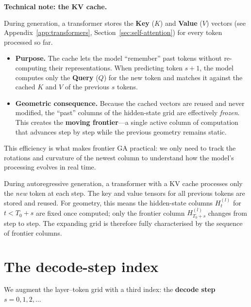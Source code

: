 \documentclass[11pt, twoside, openright]{memoir}
\numberwithin{equation}{chapter}
\begin{document}
\begin{mathbox}
\textbf{Technical note: the KV cache.}

During generation, a transformer stores the \textbf{Key} ($K$) and
\textbf{Value} ($V$) vectors (see Appendix~\ref{app:transformers},
Section~\ref{sec:self-attention}) for every token processed so far.

\begin{itemize}[nosep]
\item \textbf{Purpose.}  The cache lets the model ``remember'' past
  tokens without re-computing their representations.  When predicting
  token $s{+}1$, the model computes only the \textbf{Query} ($Q$) for
  the new token and matches it against the cached $K$ and $V$ of the
  previous $s$ tokens.
\item \textbf{Geometric consequence.}  Because the cached vectors are
  reused and never modified, the ``past'' columns of the hidden-state
  grid are effectively \emph{frozen}.  This creates the
  \textbf{moving frontier}---a single active column of computation
  that advances step by step while the previous geometry remains
  static.
\end{itemize}

This efficiency is what makes frontier GA practical: we only need to
track the rotations and curvature of the newest column to understand
how the model's processing evolves in real time.
\end{mathbox}

\begin{transformer}
During autoregressive generation, a transformer with a KV cache
processes only the \emph{new} token at each step.  The key and value
tensors for all previous tokens are stored and reused.
For geometry, this means the hidden-state columns $H^{(l)}_{t}$ for
$t < T_0 + s$ are fixed once computed; only the frontier column
$H^{(l)}_{T_0+s}$ changes from step to step.
The expanding grid is therefore fully characterised by the sequence
of frontier columns.
\end{transformer}


\section{The decode-step index}
\label{sec:frontier-index}

We augment the layer--token grid with a third index: the
\textbf{decode step} $s = 0, 1, 2, \ldots$
\end{document}
